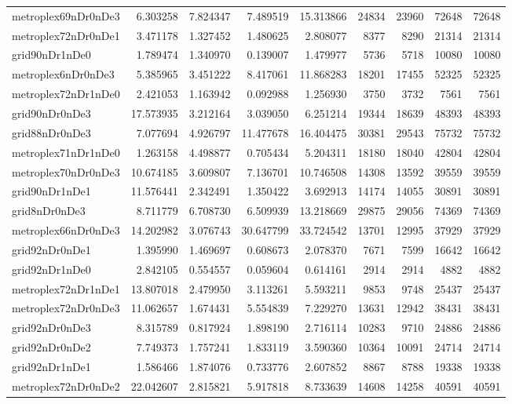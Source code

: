 \begin{longtable}{|l|r|r|r|r|r|r|r|r|}
metroplex69nDr0nDe3 & 6.303258 & 7.824347 & 7.489519 & 15.313866 & 24834 & 23960 & 72648 & 72648 \\
metroplex72nDr0nDe1 & 3.471178 & 1.327452 & 1.480625 & 2.808077 & 8377 & 8290 & 21314 & 21314 \\
grid90nDr1nDe0 & 1.789474 & 1.340970 & 0.139007 & 1.479977 & 5736 & 5718 & 10080 & 10080 \\
metroplex6nDr0nDe3 & 5.385965 & 3.451222 & 8.417061 & 11.868283 & 18201 & 17455 & 52325 & 52325 \\
metroplex72nDr1nDe0 & 2.421053 & 1.163942 & 0.092988 & 1.256930 & 3750 & 3732 & 7561 & 7561 \\
grid90nDr0nDe3 & 17.573935 & 3.212164 & 3.039050 & 6.251214 & 19344 & 18639 & 48393 & 48393 \\
grid88nDr0nDe3 & 7.077694 & 4.926797 & 11.477678 & 16.404475 & 30381 & 29543 & 75732 & 75732 \\
metroplex71nDr1nDe0 & 1.263158 & 4.498877 & 0.705434 & 5.204311 & 18180 & 18040 & 42804 & 42804 \\
metroplex70nDr0nDe3 & 10.674185 & 3.609807 & 7.136701 & 10.746508 & 14308 & 13592 & 39559 & 39559 \\
grid90nDr1nDe1 & 11.576441 & 2.342491 & 1.350422 & 3.692913 & 14174 & 14055 & 30891 & 30891 \\
grid8nDr0nDe3 & 8.711779 & 6.708730 & 6.509939 & 13.218669 & 29875 & 29056 & 74369 & 74369 \\
metroplex66nDr0nDe3 & 14.202982 & 3.076743 & 30.647799 & 33.724542 & 13701 & 12995 & 37929 & 37929 \\
grid92nDr0nDe1 & 1.395990 & 1.469697 & 0.608673 & 2.078370 & 7671 & 7599 & 16642 & 16642 \\
grid92nDr1nDe0 & 2.842105 & 0.554557 & 0.059604 & 0.614161 & 2914 & 2914 & 4882 & 4882 \\
metroplex72nDr1nDe1 & 13.807018 & 2.479950 & 3.113261 & 5.593211 & 9853 & 9748 & 25437 & 25437 \\
metroplex72nDr0nDe3 & 11.062657 & 1.674431 & 5.554839 & 7.229270 & 13631 & 12942 & 38431 & 38431 \\
grid92nDr0nDe3 & 8.315789 & 0.817924 & 1.898190 & 2.716114 & 10283 & 9710 & 24886 & 24886 \\
grid92nDr0nDe2 & 7.749373 & 1.757241 & 1.833119 & 3.590360 & 10364 & 10091 & 24714 & 24714 \\
grid92nDr1nDe1 & 1.586466 & 1.874076 & 0.733776 & 2.607852 & 8867 & 8788 & 19338 & 19338 \\
metroplex72nDr0nDe2 & 22.042607 & 2.815821 & 5.917818 & 8.733639 & 14608 & 14258 & 40591 & 40591 \\

\end{longtable}
